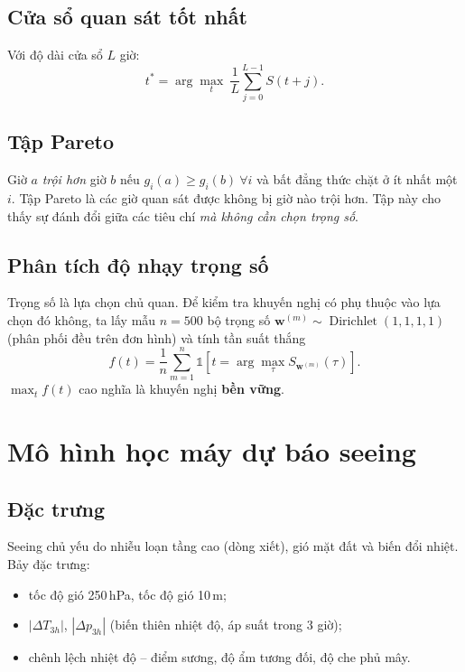 \documentclass[12pt,a4paper]{article}
\newcommand{\ind}{\mathbb{1}}
\begin{document}
\subsection{Cửa sổ quan sát tốt nhất}
Với độ dài cửa sổ $L$ giờ:
\begin{equation}
t^\ast = \arg\max_{t}\ \frac{1}{L}\sum_{j=0}^{L-1} S(t+j).
\end{equation}

\subsection{Tập Pareto}
Giờ $a$ \emph{trội hơn} giờ $b$ nếu $g_i(a)\ge g_i(b)\ \forall i$ và bất đẳng thức chặt ở ít
nhất một $i$. Tập Pareto là các giờ quan sát được không bị giờ nào trội hơn. Tập này cho thấy
sự đánh đổi giữa các tiêu chí \emph{mà không cần chọn trọng số}.

\subsection{Phân tích độ nhạy trọng số}
Trọng số là lựa chọn chủ quan. Để kiểm tra khuyến nghị có phụ thuộc vào lựa chọn đó không, ta
lấy mẫu $n=500$ bộ trọng số $\bm{w}^{(m)}\sim\operatorname{Dirichlet}(1,1,1,1)$ (phân phối đều
trên đơn hình) và tính tần suất thắng
\begin{equation}
f(t) = \frac{1}{n}\sum_{m=1}^{n}\ind\!\left[t = \arg\max_{\tau} S_{\bm{w}^{(m)}}(\tau)\right].
\end{equation}
$\max_t f(t)$ cao nghĩa là khuyến nghị \textbf{bền vững}.

\section{Mô hình học máy dự báo seeing}

\subsection{Đặc trưng}
Seeing chủ yếu do nhiễu loạn tầng cao (dòng xiết), gió mặt đất và biến đổi nhiệt. Bảy đặc trưng:
\begin{itemize}[nosep]
  \item tốc độ gió 250\,hPa, tốc độ gió 10\,m;
  \item $|\Delta T_{3h}|$, $|\Delta p_{3h}|$ (biến thiên nhiệt độ, áp suất trong 3 giờ);
  \item chênh lệch nhiệt độ -- điểm sương, độ ẩm tương đối, độ che phủ mây.
\end{itemize}
\end{document}
